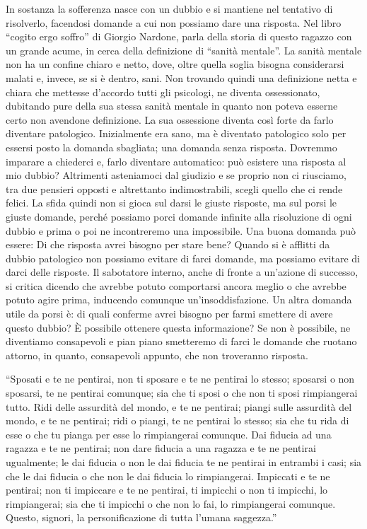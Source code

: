 \documentclass[12pt]{book} %
\begin{document}
In sostanza la sofferenza nasce con un dubbio e si mantiene nel tentativo di risolverlo, facendosi domande a cui non
possiamo dare una risposta. Nel libro “cogito ergo soffro” di Giorgio
Nardone, parla della storia di questo ragazzo con un grande acume, in cerca della definizione di “sanità mentale”. La
sanità mentale non ha un confine chiaro e netto, dove, oltre quella soglia bisogna considerarsi malati e, invece, se si
è dentro, sani. Non trovando quindi una definizione netta e chiara che mettesse d'accordo tutti
gli psicologi, ne diventa ossessionato, dubitando pure della sua stessa sanità mentale in quanto non poteva esserne
certo non avendone definizione. La sua ossessione diventa così forte da farlo diventare patologico. Inizialmente era
sano, ma è diventato patologico solo per essersi posto la domanda sbagliata; una domanda senza risposta. Dovremmo
imparare a chiederci e, farlo diventare automatico: può esistere una risposta al mio dubbio? Altrimenti asteniamoci dal
giudizio e se proprio non ci riusciamo, tra due pensieri opposti e altrettanto indimostrabili, scegli quello che ci
rende felici. La sfida quindi non si gioca sul darsi le giuste risposte, ma sul porsi le giuste domande, perché
possiamo porci domande infinite alla risoluzione di ogni dubbio e prima o poi ne incontreremo una impossibile. Una
buona domanda può essere: Di che risposta avrei bisogno per stare bene? Quando si è afflitti da dubbio patologico non
possiamo evitare di farci domande, ma possiamo evitare di darci delle
risposte. Il sabotatore interno, anche di fronte a un'azione di successo, si critica dicendo che
avrebbe potuto comportarsi ancora meglio o che avrebbe potuto agire prima, inducendo comunque
un'insoddisfazione. Un altra domanda utile da porsi è: di quali conferme avrei bisogno per farmi
smettere di avere questo dubbio? È possibile ottenere questa informazione? Se non è possibile, ne diventiamo
consapevoli e pian piano smetteremo di farci le domande che ruotano attorno, in quanto, consapevoli appunto, che non
troveranno risposta. 

“Sposati e te ne pentirai, non ti sposare e te ne pentirai lo stesso; sposarsi o non sposarsi, te ne pentirai comunque;
sia che ti sposi o che non ti sposi rimpiangerai tutto. Ridi delle assurdità del mondo, e te ne pentirai; piangi sulle
assurdità del mondo, e te ne pentirai; ridi o piangi, te ne pentirai lo stesso; sia che tu rida di esse o che tu pianga
per esse lo rimpiangerai comunque. Dai fiducia ad una ragazza e te ne pentirai; non dare fiducia a una ragazza e te ne
pentirai ugualmente; le dai fiducia o non le dai fiducia te ne pentirai in entrambi i casi; sia che le dai fiducia o
che non le dai fiducia lo rimpiangerai. Impiccati e te ne pentirai; non ti impiccare e te ne pentirai, ti impicchi o
non ti impicchi, lo rimpiangerai; sia che ti impicchi o che non lo fai, lo rimpiangerai comunque. Questo, signori, la
personificazione di tutta l'umana saggezza.”
\end{document}
